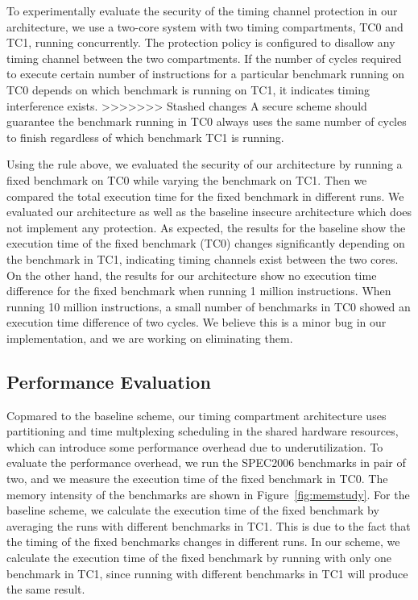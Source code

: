 To experimentally evaluate the security of the timing channel protection in our architecture,
we use a two-core system with two timing compartments, TC0 and TC1, running
concurrently. The protection policy is configured to disallow any timing channel between
the two compartments.
If the number of cycles required to execute certain number of instructions 
for a particular benchmark running on TC0 depends on which benchmark is running on 
TC1, it indicates timing interference exists.%
>>>>>>> Stashed changes
A secure scheme should guarantee the benchmark running in TC0 always uses the same number of cycles
to finish regardless of which benchmark TC1 is running. 

Using the rule above, we evaluated the security of our architecture by running a fixed benchmark
on TC0 while varying the benchmark on TC1. Then we compared the total execution time for the fixed
benchmark in different runs. We evaluated our architecture as well as the baseline insecure architecture 
which does not implement any protection. As expected, the results for
the baseline show the execution time of the fixed benchmark (TC0) changes significantly depending on 
the benchmark in TC1, indicating timing channels exist between the two cores. On the other hand,
the results for our architecture show no execution time difference for the fixed benchmark when
running 1 million instructions. 
When running 10 million instructions, a small number of benchmarks in TC0
showed an execution time difference of two cycles. We believe this is a minor bug in our
implementation, and we are working on eliminating them.

\subsection{Performance Evaluation}
Copmared to the baseline scheme, our timing compartment architecture uses partitioning and time multplexing
scheduling in the shared hardware resources, which can introduce some performance overhead due to
underutilization. To evaluate the performance overhead, we run the SPEC2006 benchmarks in pair of two, and
we measure the execution time of the fixed benchmark in TC0. The memory intensity of the benchmarks are shown
in Figure~\ref{fig:memstudy}. For the baseline scheme, we calculate the execution time of the fixed benchmark
by averaging the runs with different benchmarks in TC1. This is due to the fact that the timing of the fixed
benchmarks changes in different runs. In our scheme, we calculate the execution time of the fixed benchmark by
running with only one benchmark in TC1, since running with different benchmarks in TC1 will produce the same
result.

